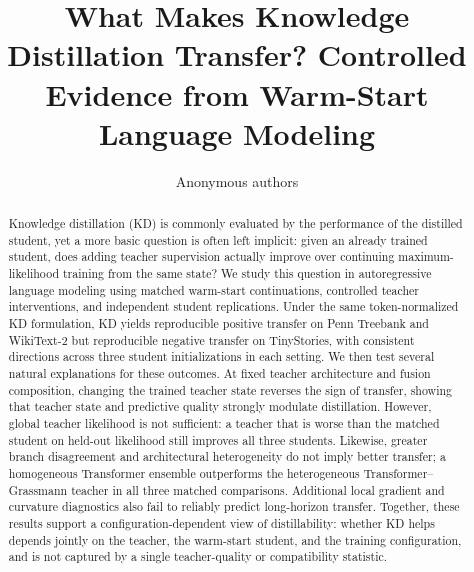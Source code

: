 \documentclass[11pt]{article}
\title{What Makes Knowledge Distillation Transfer?\newline
Controlled Evidence from Warm-Start Language Modeling}
\author{Anonymous authors}
\date{}
\begin{document}
\maketitle
\begin{abstract}
Knowledge distillation (KD) is commonly evaluated by the performance of the distilled student, yet a more basic question is often left implicit: given an already trained student, does adding teacher supervision actually improve over continuing maximum-likelihood training from the same state? We study this question in autoregressive language modeling using matched warm-start continuations, controlled teacher interventions, and independent student replications. Under the same token-normalized KD formulation, KD yields reproducible positive transfer on Penn Treebank and WikiText-2 but reproducible negative transfer on TinyStories, with consistent directions across three student initializations in each setting. We then test several natural explanations for these outcomes. At fixed teacher architecture and fusion composition, changing the trained teacher state reverses the sign of transfer, showing that teacher state and predictive quality strongly modulate distillation. However, global teacher likelihood is not sufficient: a teacher that is worse than the matched student on held-out likelihood still improves all three students. Likewise, greater branch disagreement and architectural heterogeneity do not imply better transfer; a homogeneous Transformer ensemble outperforms the heterogeneous Transformer--Grassmann teacher in all three matched comparisons. Additional local gradient and curvature diagnostics also fail to reliably predict long-horizon transfer. Together, these results support a configuration-dependent view of distillability: whether KD helps depends jointly on the teacher, the warm-start student, and the training configuration, and is not captured by a single teacher-quality or compatibility statistic.
\end{abstract}











\clearpage

\begingroup\raggedright

\endgroup
\clearpage
\appendix
\setcounter{figure}{0}
\renewcommand{\thefigure}{A\arabic{figure}}
\renewcommand{\theHfigure}{appendix.\arabic{figure}}

\end{document}
